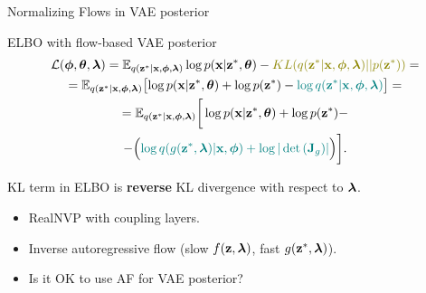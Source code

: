 \begin{frame}{Normalizing Flows in VAE posterior}
	\vspace{-0.2cm}
	\begin{block}{ELBO with flow-based VAE posterior}
		\vspace{-0.8cm}
		\begin{multline*}
			\mathcal{L} (\bphi, \btheta, \blambda) =  \bbE_{q(\bz^* | \bx, \bphi, \blambda)} \log p(\bx | \bz^*, \btheta) - {\color{olive}KL (q(\bz^* | \bx, \bphi, \blambda) || p(\bz^*))} = \\ = \bbE_{q(\bz^* | \bx, \bphi, \blambda)} \bigl[\log p(\bx | \bz^*, \btheta) + \log p(\bz^*) - {\color{teal}\log q(\bz^*| \bx, \bphi, \blambda)} \bigr] = \\
			= \bbE_{q(\bz^* | \bx, \bphi, \blambda)} \bigg[\log p(\bx| \bz^*, \btheta)  + \log p(\bz^*) - \\ - \Bigl({\color{teal}\log q(g(\bz^*, \blambda) | \bx, \bphi ) + \log | \det \left( \bJ_g ) \right| }\Bigr)  \bigg].
		\end{multline*}
	\end{block}
	\vspace{-0.7cm}
	{\color{olive}KL term} in ELBO is \textbf{reverse} KL divergence with respect to $\boldsymbol{\lambda}$.
	\begin{itemize}
		\item RealNVP with coupling layers.
		\item Inverse autoregressive flow (slow $f(\mathbf{z}, \boldsymbol{\lambda})$, fast $g(\mathbf{z}^*, \boldsymbol{\lambda})$).
		\item {\color{gray}Is it OK to use AF for VAE posterior?}
	\end{itemize}
\end{frame}
